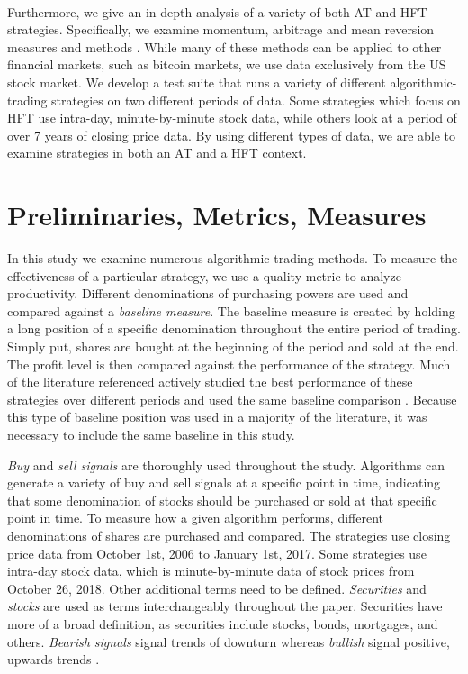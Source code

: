 \documentclass[letterpaper,11pt]{article}
\begin{document}
\paragraph{} Furthermore, we give an in-depth analysis of a variety of both AT and HFT strategies. Specifically, we examine momentum, arbitrage and mean reversion measures and methods \cite{Aldridge2010}. While many of these methods can be applied to other financial markets, such as bitcoin markets, we use data exclusively from the US stock market. We develop a test suite that runs a variety of different algorithmic-trading strategies on two different periods of data. Some strategies which focus on HFT use intra-day, minute-by-minute stock data, while others look at a period of over 7 years of closing price data. By using different types of data, we are able to examine strategies in both an AT and a HFT context. 


\section{Preliminaries, Metrics, Measures}
In this study we examine numerous algorithmic trading methods. To measure the effectiveness of a particular strategy, we use a quality metric to analyze productivity. Different denominations of purchasing powers are used and compared against a {\it baseline measure}. The baseline measure is created by holding a long position of a specific denomination throughout the entire period of trading. Simply put, shares are bought at the beginning of the period and sold at the end. The profit level is then compared against the performance of the strategy. Much of the literature referenced actively studied the best performance of these strategies over different periods and used the same baseline comparison \cite{Liu2006}. Because this type of baseline position was used in a majority of the literature, it was necessary to include the same baseline in this study.

{\it Buy} and {\it sell signals} are thoroughly used throughout the study. Algorithms can generate a variety of buy and sell signals at a specific point in time, indicating that some denomination of stocks should be purchased or sold at that specific point in time. To measure how a given algorithm performs, different denominations of shares are purchased and compared. The strategies use closing price data from October 1st, 2006 to January 1st, 2017. Some strategies use intra-day stock data, which is minute-by-minute data of stock prices from October 26, 2018. Other additional terms need to be defined. {\it Securities} and {\it stocks } are used as terms interchangeably throughout the paper. Securities have more of a broad definition, as securities include stocks, bonds, mortgages, and others. {\it Bearish signals} signal trends of downturn whereas {\it bullish} signal positive, upwards trends \cite{Aldridge2010}. 
\end{document}
